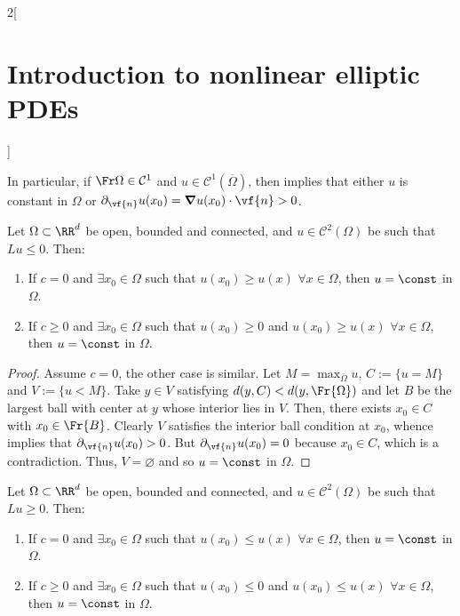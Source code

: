 \documentclass[../../../main_math.tex]{subfiles}
\begin{document}
\begin{multicols}{2}[\section{Introduction to nonlinear elliptic PDEs}]
\begin{lemma}
  \end{lemma}
  \begin{remark}
    In particular, if $\Fr\Omega\in\mathcal{C}^1$ and $u\in \mathcal{C}^1(\overline{\Omega})$, then  implies that either $u$ is constant in $\Omega$ or $\partial_{\vf{n}}u(x_0)=\grad u(x_0)\cdot \vf{n}>0$.
  \end{remark}
  \begin{theorem}\label{INEPDE:strong_max_principle}
    Let $\Omega\subset\RR^d$ be open, bounded and connected, and $u\in \mathcal{C}^2(\Omega)$ be such that $Lu\leq 0$. Then:
    \begin{enumerate}
      \item If $c=0$ and $\exists x_0\in\Omega$ such that $u(x_0)\geq u(x)$ $\forall x\in\Omega$, then $u=\const$ in $\Omega$.
      \item If $c\geq 0$ and $\exists x_0\in\Omega$ such that $u(x_0)\geq 0$ and $u(x_0)\geq u(x)$ $\forall x\in\Omega$, then $u=\const$ in $\Omega$.
    \end{enumerate}
  \end{theorem}
  \begin{proof}
    Assume $c=0$, the other case is similar. Let $\displaystyle M=\max_{\overline{\Omega}}u$, $C:= \{u=M\}$ and $V:=\{u<M\}$. Take $y\in V$ satisfying $d(y,C)<d(y,\Fr{\Omega})$ and let $B$ be the largest ball with center at $y$ whose interior lies in $V$. Then, there exists $x_0\in C$ with $x_0\in \Fr{B}$. Clearly $V$ satisfies the interior ball condition at $x_0$, whence  implies that $\partial_{\vf{n}}u(x_0)>0$. But $\partial_{\vf{n}}u(x_0)=0$ because $x_0\in C$, which is a contradiction. Thus, $V=\varnothing$ and so $u=\const$ in $\Omega$.
  \end{proof}
  \begin{theorem}\label{INEPDE:strong_min_principle}
    Let $\Omega\subset\RR^d$ be open, bounded and connected, and $u\in \mathcal{C}^2(\Omega)$ be such that $Lu\geq 0$. Then:
    \begin{enumerate}
      \item If $c=0$ and $\exists x_0\in\Omega$ such that $u(x_0)\leq u(x)$ $\forall x\in\Omega$, then $u=\const$ in $\Omega$.
      \item If $c\geq 0$ and $\exists x_0\in\Omega$ such that $u(x_0)\leq 0$ and $u(x_0)\leq u(x)$ $\forall x\in\Omega$, then $u=\const$ in $\Omega$.
    \end{enumerate}
  \end{theorem}

\end{multicols}
\end{document}
